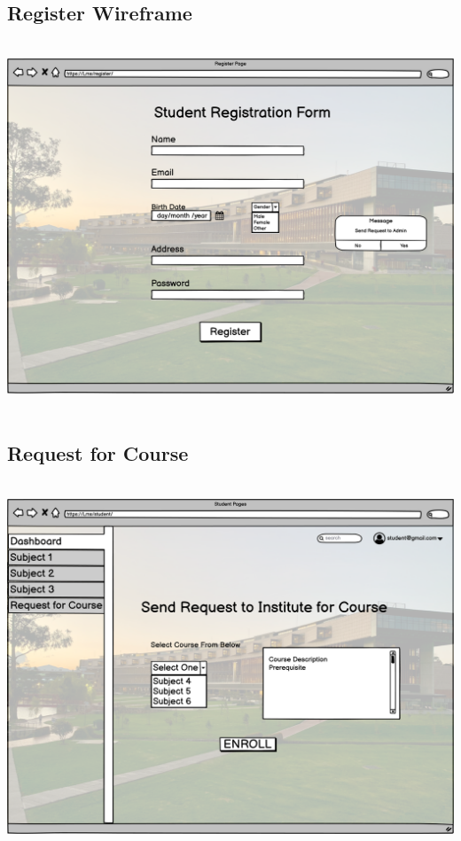 \subsection{Register Wireframe}

\includegraphics[width=18cm, height=11cm]{HW_1/images/Register Wireframe.png}

\subsection{Request for Course}

\includegraphics[width=18cm, height=11cm]{HW_1/images/Request for Course.png}

